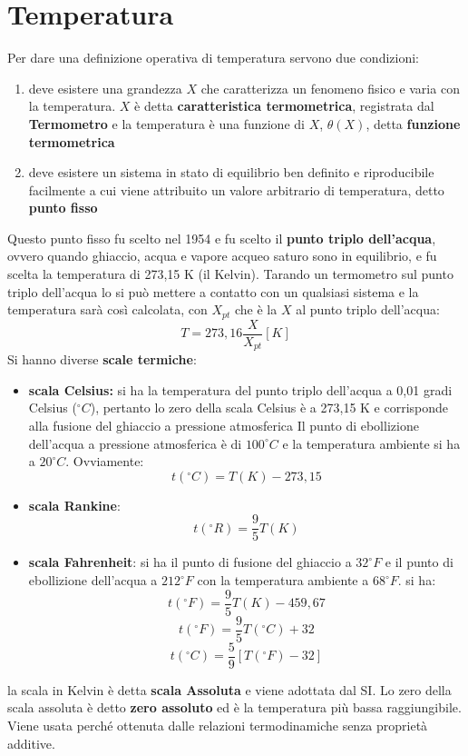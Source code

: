 \documentclass[a4paper,12pt, oneside]{book}
\begin{document}
\section{Temperatura} 
Per dare una definizione operativa di temperatura servono due condizioni:
\begin{enumerate}
\item deve esistere una grandezza $X$ che caratterizza un fenomeno fisico e varia con la temperatura. $X$ è detta \textbf{caratteristica termometrica}, registrata dal \textbf{Termometro} e la temperatura è una funzione di $X$, $\theta(X)$, detta \textbf{funzione termometrica}  
\item deve esistere un sistema in stato di equilibrio ben definito e riproducibile facilmente a cui viene attribuito un valore arbitrario di temperatura, detto \textbf{punto fisso} 
\end{enumerate} 
Questo punto fisso fu scelto nel 1954 e fu scelto il \textbf{punto triplo dell'acqua}, ovvero quando ghiaccio, acqua e vapore acqueo saturo sono in equilibrio, e fu scelta la temperatura di 273,15 K (il Kelvin). Tarando un termometro sul punto triplo dell'acqua lo si può mettere a contatto con un qualsiasi sistema e la temperatura sarà così calcolata, con $X_{pt}$ che è la $X$ al punto triplo dell'acqua:
$$T=273,16\frac{X}{X_{pt}}[K]$$
\newpage
Si hanno diverse \textbf{scale termiche}:
\begin{itemize}
\item \textbf{scala Celsius:} si ha la temperatura del punto triplo dell'acqua a 0,01 gradi Celsius ($^{\circ}C$), pertanto lo zero della scala Celsius è a 273,15 K e corrisponde alla fusione del ghiaccio a pressione atmosferica Il punto di ebollizione dell'acqua a pressione atmosferica è di $100^{\circ}C$ e la temperatura ambiente si ha a $20^{\circ}C$. Ovviamente:
$$t(^{\circ}C)=T(K)-273,15$$
\item \textbf{scala Rankine}:
$$t(^{\circ}R)=\frac{9}{5} T(K)$$
\item \textbf{scala Fahrenheit}: si ha il punto di fusione del ghiaccio a $32^{\circ}F$ e il punto di ebollizione dell'acqua a $212^{\circ}F$ con la temperatura ambiente a $68^{\circ}F$. si ha:
$$t(^{\circ}F)=\frac{9}{5} T(K)-459,67$$
$$t(^{\circ}F)=\frac{9}{5} T(^{\circ}C)+32$$
$$t(^{\circ}C)=\frac{5}{9} [T(^{\circ}F)-32]$$
\end{itemize}
la scala in Kelvin è detta \textbf{scala Assoluta} e viene adottata dal SI. Lo zero della scala assoluta è detto \textbf{zero assoluto} ed è la temperatura più bassa raggiungibile. Viene usata perché ottenuta dalle relazioni termodinamiche senza proprietà additive.
\end{document}
